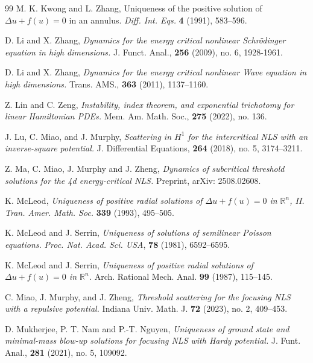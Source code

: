 \documentclass[12pt]{amsart}
\begin{document}
\begin{thebibliography}{99}
{\sc M. K. Kwong and L. Zhang,}
Uniqueness of the positive solution of $\Delta u+f(u)=0$ in
an annulus. {\it Diff. Int. Eqs.} {\bf 4} (1991), 583--596.



 D. Li and X. Zhang, \emph{Dynamics for the energy critical nonlinear Schr\"{o}dinger equation in high dimensions.}
J. Funct. Anal., \textbf{256} (2009), no. 6, 1928-1961.

 D. Li and X. Zhang, \emph{Dynamics for the energy critical nonlinear Wave equation in high dimensions.}
Trans. AMS., \textbf{363} (2011), 1137–1160.

 Z. Lin and C. Zeng, \emph{Instability, index theorem, and exponential trichotomy for linear Hamiltonian PDEs.} Mem. Am. Math. Soc., \textbf{275} (2022), no. 136.



J. Lu, C. Miao, and J. Murphy, \emph{Scattering in $H^1$ for the intercritical NLS with an inverse-square potential.} J. Differential Equations,  \textbf{264} (2018), no. 5, 3174–3211. 


Z. Ma, C. Miao, J. Murphy and J. Zheng, \emph{Dynamics of subcritical threshold solutions for the 4d energy-critical NLS.} Preprint, arXiv: 2508.02608.


{  K. McLeod,}
\emph{Uniqueness of positive radial solutions of $\Delta u+f(u)=0$ in $\mathbb{R}^n$, II.}
{\it Tran. Amer. Math. Soc.} {\bf 339}  (1993), 495--505.

{  K. McLeod and J. Serrin,} \emph{Uniqueness of solutions of semilinear Poisson equations.}
{\it Proc. Nat. Acad. Sci. USA}, {\bf 78} (1981), 6592--6595.


{ K. McLeod and J. Serrin,}
\emph{Uniqueness of positive radial solutions of $\Delta u+f(u)=0$ in $\mathbb{R}^n$.}
{  Arch. Rational Mech. Anal.}
{\bf 99} (1987), 115--145.

 C. Miao, J. Murphy, and J. Zheng, \emph{Threshold scattering for the focusing NLS with a repulsive potential.} Indiana Univ. Math. J. \textbf{72} (2023), no. 2, 409–453. 
 
 D. Mukherjee, P. T. Nam and P.-T. Nguyen, \emph{Uniqueness of ground state and minimal-mass blow-up solutions for focusing NLS with Hardy potential.} J. Funt. Anal., \textbf{281} (2021), no. 5, 109092.


\end{thebibliography}
\end{document}
